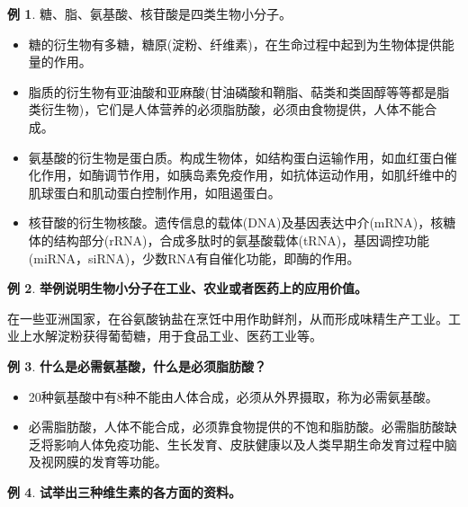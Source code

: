 \documentclass[UTF8]{article}
\theoremstyle{definition}
\newtheorem{example}{例}[section]
\begin{document}
\begin{example}
    糖、脂、氨基酸、核苷酸是四类生物小分子。\begin{itemize}
        \item 糖的衍生物有多糖，糖原(淀粉、纤维素)，在生命过程中起到为生物体提供能量的作用。
        \item 脂质的衍生物有亚油酸和亚麻酸(甘油磷酸和鞘脂、萜类和类固醇等等都是脂类衍生物)，它们是人体营养的必须脂肪酸，必须由食物提供，人体不能合成。
        \item 氨基酸的衍生物是蛋白质。构成生物体，如结构蛋白运输作用，如血红蛋白催化作用，如酶调节作用，如胰岛素免疫作用，如抗体运动作用，如肌纤维中的肌球蛋白和肌动蛋白控制作用，如阻遏蛋白。
        \item 核苷酸的衍生物核酸。遗传信息的载体(DNA)及基因表达中介(mRNA)，核糖体的结构部分(rRNA)，合成多肽时的氨基酸载体(tRNA)，基因调控功能(miRNA，siRNA)，少数RNA有自催化功能，即酶的作用。
    \end{itemize}
\end{example}\begin{example}\textbf{举例说明生物小分子在工业、农业或者医药上的应用价值。}
    
    在一些亚洲国家，在谷氨酸钠盐在烹饪中用作助鲜剂，从而形成味精生产工业。工业上水解淀粉获得葡萄糖，用于食品工业、医药工业等。
\end{example}\begin{example}\textbf{什么是必需氨基酸，什么是必须脂肪酸？}
    
    \begin{itemize}
        \item 20种氨基酸中有8种不能由人体合成，必须从外界摄取，称为必需氨基酸。
        \item 必需脂肪酸，人体不能合成，必须靠食物提供的不饱和脂肪酸。必需脂肪酸缺乏将影响人体免疫功能、生长发育、皮肤健康以及人类早期生命发育过程中脑及视网膜的发育等功能。
    \end{itemize}
\end{example}\begin{example}\textbf{试举出三种维生素的各方面的资料。}
    

\end{example}
\end{document}
